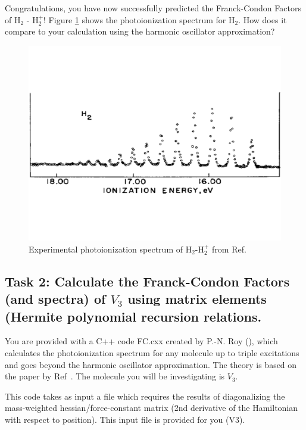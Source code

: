 \documentclass[12pt]{article}
\begin{document}
Congratulations, you have now successfully predicted the Franck-Condon Factors of H$_2$ - H$_2^+$! Figure \ref{fig:h2_spectrum} shows the photoionization spectrum for H$_2$. How does it compare to your calculation using the harmonic oscillator approximation?

\begin{figure}
    \begin{center}
        \includegraphics[width=\linewidth]{figures/H2-expspectrum.pdf}
    \end{center}
    \caption{
    Experimental photoionization spectrum of H$_2$-H$_2^+$ from Ref.~\cite{berkowitz1973comparison}
    }
    \label{fig:h2_spectrum}
\end{figure}




\subsection{Task 2: Calculate the Franck-Condon Factors (and spectra) of $V_3$ using matrix elements (Hermite polynomial recursion relations.}

You are provided with a C++ code FC.cxx created by P.-N. Roy (\cite{yang1995structure}), which calculates the photoionization spectrum for any molecule up to triple excitations and goes beyond the harmonic oscillator approximation. The theory is based on the paper by Ref~\cite{doktorov1977dynamical}. The molecule you will be investigating is $V_3$.

\noindent This code takes as input a file which requires the results of diagonalizing the mass-weighted hessian/force-constant matrix (2nd derivative of the Hamiltonian with respect to position). This input file is provided for you (V3).
\end{document}
